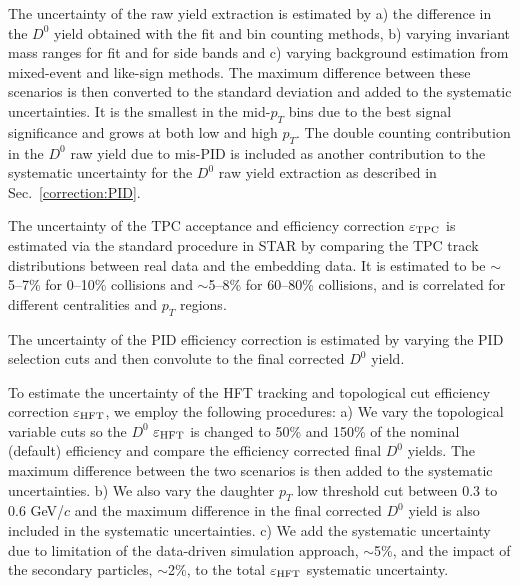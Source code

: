 \documentclass[%
 reprint,	
 amsmath,amssymb,
 aps,
 prc,
]{revtex4-1}
\begin{document}
The uncertainty of the raw yield extraction is estimated by a) the difference in the $D^0$ yield obtained with the fit and bin counting methods, b) varying invariant mass ranges for fit and for side bands and c) varying background estimation from mixed-event and like-sign methods. The maximum difference between these scenarios is then converted to the standard deviation and added to the systematic uncertainties. It is the smallest in the mid-$p_{T}$ bins due to the best signal significance and grows at both low and high $p_{T}$. The double counting contribution in the $D^0$ raw yield  due to mis-PID is included as another contribution to the systematic uncertainty for the $D^0$ raw yield extraction as described in Sec.~\ref{correction:PID}.

The uncertainty of the TPC acceptance and efficiency correction $\varepsilon_{\rm TPC}$ is estimated via the standard procedure in STAR by comparing the TPC track distributions between real data and the embedding data. It is estimated to be $\sim$5--7\% for 0--10\% collisions and $\sim$5--8\% for 60--80\% collisions, and is correlated for different centralities and $p_{T}$ regions. 

The uncertainty of the PID efficiency correction is estimated by varying the PID selection cuts and then convolute to the final corrected $D^0$ yield. 


To estimate the uncertainty of the HFT tracking and topological cut efficiency correction $\varepsilon_{\rm HFT}$, we employ the following procedures: a) We vary the topological variable cuts so the $D^0$ $\varepsilon_{\rm HFT}$ is changed to 50\% and 150\% of the nominal (default) efficiency and compare the efficiency corrected final $D^0$ yields. The maximum difference between the two scenarios is then added to the systematic uncertainties. b) We also vary the daughter $p_{T}$ low threshold cut between 0.3 to 0.6 GeV/$c$ and the maximum difference in the final corrected $D^0$ yield is also included in the systematic uncertainties. c) We add the systematic uncertainty due to limitation of the data-driven simulation approach, $\sim$5\%, and the impact of the secondary particles, $\sim$2\%, to the total $\varepsilon_{\rm HFT}$ systematic uncertainty.%
\end{document}
